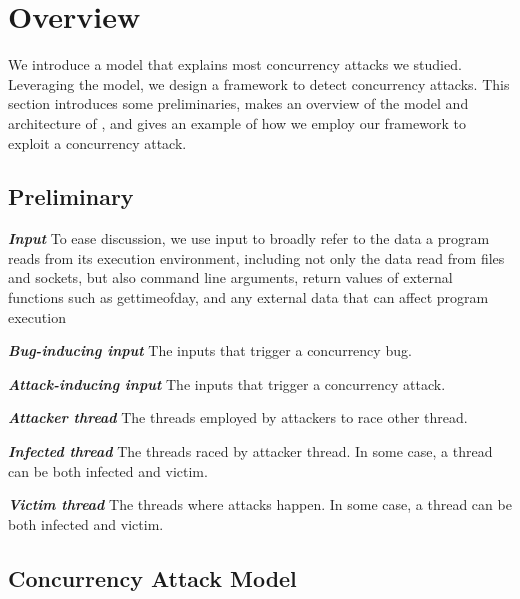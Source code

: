 
\section{Overview}\label{sec:overview}
We introduce a model that explains most concurrency attacks we studied. 
Leveraging the model, we design a framework \xxx
to detect concurrency attacks. 
This section introduces some preliminaries, 
makes an overview of the model and architecture of \xxx, 
and gives an example of how we employ our framework to exploit a concurrency attack. 

\subsection{Preliminary}\label{sec:preliminary}

\emph{\textbf{Input}} To ease discussion, we use input to broadly refer to the data a program
reads from its execution environment, including not only the
data read from files and sockets, but also command line arguments,
return values of external functions such as gettimeofday, and any
external data that can affect program execution

\emph{\textbf{Bug-inducing input}} The inputs that trigger a concurrency bug. 

\emph{\textbf{Attack-inducing input}} The inputs that trigger a concurrency attack.

\emph{\textbf{Attacker thread}} The threads employed by attackers to race other thread.

\emph{\textbf{Infected thread}} The threads raced by attacker thread. In some case, a thread 
can be both infected and victim.

\emph{\textbf{Victim thread}} The threads where attacks happen. In some case, a thread 
can be both infected and victim.


\subsection{Concurrency Attack Model}\label{sec:model}



